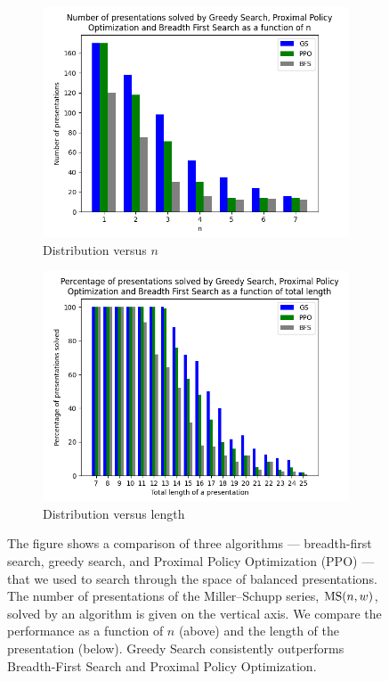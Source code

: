 \begin{figure}
	\centering
	\begin{subfigure}[b]{0.5\textwidth}
		\includegraphics[width=1.1\textwidth]{fig/performance_vs_n.png}
		\caption{Distribution versus $n$}
		\label{fig:performance_vs_n}
	\end{subfigure}
	\begin{subfigure}[b]{0.5\textwidth}
		\centering
		\includegraphics[width=1.1\textwidth]{fig/performance_vs_length.png}
		\caption{Distribution versus length}
		\label{fig:performance_vs_length}
	\end{subfigure}
	\caption{The figure shows a comparison of three algorithms --- breadth-first search, greedy search, and Proximal Policy Optimization (PPO) --- that we used to search through the space of balanced presentations. The number of presentations of the Miller--Schupp series, $\text{MS}(n, w)$, solved by an algorithm is given on the vertical axis. We compare the performance as a function of $n$ (above) and the length of the presentation (below). Greedy Search consistently outperforms Breadth-First Search and Proximal Policy Optimization.}
	\label{fig:performance}
\end{figure}

